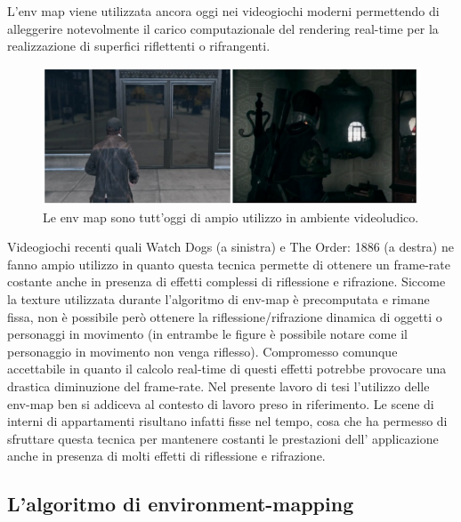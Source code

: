L’env map viene utilizzata ancora oggi nei videogiochi moderni permettendo di alleggerire notevolmente il carico computazionale del rendering real-time per la realizzazione di superfici riflettenti o rifrangenti.
\\
\begin{figure}[htb]
 \centering
 \includegraphics[width=0.5\linewidth]{images/chapter_stato_arte/stato_arte_wd_to.png}\hfill
 \caption[Le env map nei videogiochi]{Le env map sono tutt'oggi di ampio utilizzo in ambiente videoludico.}
 \label{fig:stato_arte_wd_to}
\end{figure}

Videogiochi recenti quali Watch Dogs (a sinistra) e The Order: 1886 (a destra) ne fanno ampio utilizzo in quanto questa tecnica permette di ottenere un frame-rate costante anche in presenza di effetti complessi di riflessione e rifrazione. Siccome la texture utilizzata durante l’algoritmo di env-map è precomputata e rimane fissa, non è possibile però ottenere la riflessione/rifrazione dinamica di oggetti o personaggi in movimento (in entrambe le figure è possibile notare come  il personaggio in movimento non venga riflesso). Compromesso comunque accettabile in quanto il calcolo real-time di questi effetti potrebbe provocare una drastica diminuzione del frame-rate.
Nel presente lavoro di tesi l’utilizzo delle env-map ben si addiceva al contesto di lavoro preso in riferimento. Le scene di interni di appartamenti risultano infatti fisse nel tempo,  cosa che ha permesso di sfruttare questa tecnica per mantenere costanti le prestazioni dell’ applicazione anche in presenza di molti effetti di riflessione e rifrazione.

\subsection{L'algoritmo di environment-mapping}
\label{sec:chapter_stato_arte_algo_envmapping}

